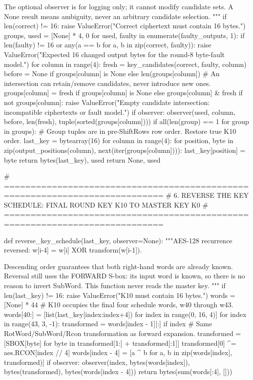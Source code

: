 \begin{lightcode}[numbers=left,firstnumber=1]
    The optional observer is for logging only; it cannot modify candidate sets.
    A None result means ambiguity, never an arbitrary candidate selection.
    """
    if len(correct) != 16:
        raise ValueError("Correct ciphertext must contain 16 bytes.")
    groups, used = [None] * 4, 0
    for used, faulty in enumerate(faulty_outputs, 1):
        if len(faulty) != 16 or any(a == b for a, b in zip(correct, faulty)):
            raise ValueError("Expected 16 changed output bytes for the round-8 byte-fault model.")
        for column in range(4):
            fresh = key_candidates(correct, faulty, column)
            before = None if groups[column] is None else len(groups[column])
            # An intersection can retain/remove candidates, never introduce new ones.
            groups[column] = fresh if groups[column] is None else groups[column] & fresh
            if not groups[column]:
                raise ValueError("Empty candidate intersection: incompatible ciphertexts or fault model.")
            if observer:
                observer(used, column, before, len(fresh), tuple(sorted(groups[column])))
        if all(len(group) == 1 for group in groups):
            # Group tuples are in pre-ShiftRows row order. Restore true K10 order.
            last_key = bytearray(16)
            for column in range(4):
                for position, byte in zip(output_positions(column), next(iter(groups[column]))):
                    last_key[position] = byte
            return bytes(last_key), used
    return None, used


# ============================================================================
# 6. REVERSE THE KEY SCHEDULE: FINAL ROUND KEY K10 TO MASTER KEY K0
# ============================================================================


def reverse_key_schedule(last_key, observer=None):
    """AES-128 recurrence reversed: w[i-4] = w[i] XOR transform(w[i-1]).

    Descending order guarantees that both right-hand words are already known.
    Reversal still uses the FORWARD S-box: its input word is known, so there
    is no reason to invert SubWord. This function never reads the master key.
    """
    if len(last_key) != 16:
        raise ValueError("K10 must contain 16 bytes.")
    words = [None] * 44
    # K10 occupies the final four schedule words, w40 through w43.
    words[40:] = [list(last_key[index:index+4]) for index in range(0, 16, 4)]
    for index in range(43, 3, -1):
        transformed = words[index - 1][:]
        if index %
            # Same RotWord/SubWord/Rcon transformation as forward expansion.
            transformed = [SBOX[byte] for byte in transformed[1:] + transformed[:1]]
            transformed[0] ^= aes.RCON[index // 4]
        words[index - 4] = [a ^ b for a, b in zip(words[index], transformed)]
        if observer:
            observer(index, bytes(words[index]), bytes(transformed), bytes(words[index - 4]))
    return bytes(sum(words[:4], []))



\end{lightcode}
